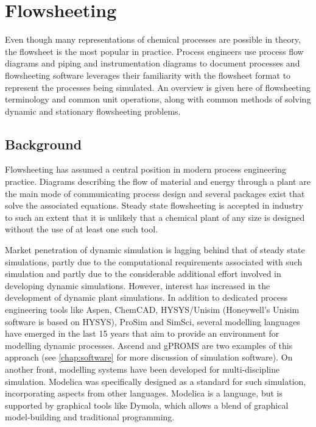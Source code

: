 \chapter{Flowsheeting}

\begin{overview}
  Even though many representations of chemical processes are possible
  in theory, the flowsheet is the most popular in practice.  Process
  engineers use process flow diagrams and piping and instrumentation
  diagrams to document processes and flowsheeting software leverages
  their familiarity with the flowsheet format to represent the
  processes being simulated.  An overview is given here of
  flowsheeting terminology and common unit operations, along with
  common methods of solving dynamic and stationary flowsheeting
  problems.
\end{overview}

\section{Background}
Flowsheeting has assumed a central position in modern process engineering
practice.  Diagrams describing the flow of material and energy through a plant are the main mode of communicating process
design and several packages exist that solve the associated equations.
Steady state flowsheeting is accepted in industry to such an extent
that it is unlikely that a chemical plant of any size is designed
without the use of at least one such tool.~\cite{glasscock_simulation}

Market penetration of dynamic simulation is lagging behind that of
steady state simulations, partly due to the computational requirements
associated with such simulation and partly due to the considerable
additional effort involved in developing dynamic simulations.
However, interest has increased in the development of dynamic plant
simulations.  In addition to dedicated process engineering tools like
Aspen, ChemCAD, HYSYS/Unisim (Honeywell's Unisim software is
  based on HYSYS), ProSim and SimSci, several modelling languages have
emerged in the last 15 years that aim to provide an environment for
modelling dynamic processes.  Ascend and gPROMS are two examples of
this approach (see \ref{chap:software} for more discussion of simulation
software). On another front, modelling systems have been developed for
multi-discipline simulation.  Modelica was specifically designed as a standard
for such simulation, incorporating aspects from other languages\cite{elmqvist97,tillerbook}.  Modelica is a language,
but is supported by graphical tools like Dymola, which allows a blend
of graphical model-building and traditional programming.


